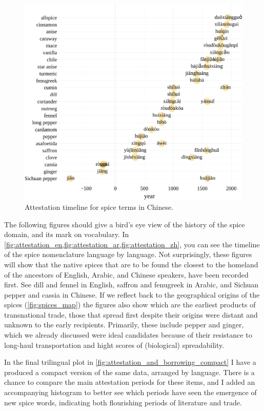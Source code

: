\begin{figure}[!ht]
  \centering
  \includegraphics[width=\linewidth]{imgs/plots/attestation_zh.pdf}
  \caption{Attestation timeline for spice terms in Chinese.}
  \label{fig:attestation_zh}
\end{figure}

The following figures should give a bird's eye view of the history of the spice domain, and its mark on vocabulary. In \cref{fig:attestation_en,fig:attestation_ar,fig:attestation_zh}, you can see the timeline of the spice nomenclature language by language. Not surprisingly, these figures will show that the native spices that are to be found the closest to the homeland of the ancestors of English, Arabic, and Chinese speakers, have been recorded first. See dill and fennel in English, saffron and fenugreek in Arabic, and Sichuan pepper and cassia in Chinese. If we reflect back to the geographical origins of the spices (\cref{fig:spices_map}) the figures also show which are the earliest products of transnational trade, those that spread first despite their origins were distant and unknown to the early recipients. Primarily, these include pepper and ginger, which we already discussed were ideal candidates because of their resistance to long-haul transportation and hight scores of (biological) spreadability. 

In the final trilingual plot in \cref{fig:attestation_and_borrowing_compact} I have a produced a compact version of the same data, arranged by language. There is a chance to compare the main attestation periods for these items, and I added an accompanying histogram to better see which periods have seen the emergence of new spice words, indicating both flourishing periods of literature and trade. 

